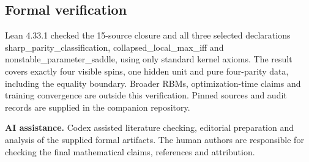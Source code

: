 \documentclass[11pt,a4paper]{article}
\begin{document}
\subsection{Formal verification}
Lean 4.33.1 checked the 15-source closure and all three selected declarations sharp\_parity\_classification, collapsed\_local\_max\_iff and nonstable\_parameter\_saddle, using only standard kernel axioms. The result covers exactly four visible spins, one hidden unit and pure four-parity data, including the equality boundary. Broader RBMs, optimization-time claims and training convergence are outside this verification. Pinned sources and audit records are supplied in the companion repository.

{\small \textbf{AI assistance.} Codex assisted literature checking, editorial preparation and analysis of the supplied formal artifacts. The human authors are responsible for checking the final mathematical claims, references and attribution.\par}
\end{document}
